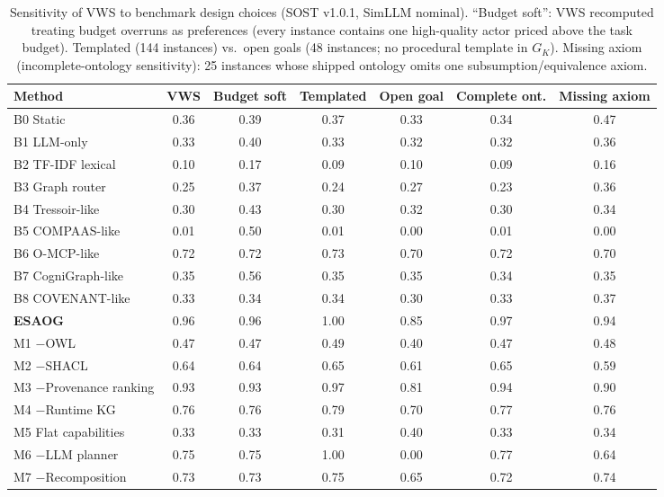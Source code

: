 \begin{table}[H]
\centering
\caption{Sensitivity of VWS to benchmark design choices (SOST v1.0.1, SimLLM nominal). ``Budget soft'': VWS recomputed treating budget overruns as preferences (every instance contains one high-quality actor priced above the task budget). Templated (144 instances) vs.\ open goals (48 instances; no procedural template in $G_K$). Missing axiom (incomplete-ontology sensitivity): 25 instances whose shipped ontology omits one subsumption/equivalence axiom.}
\label{tab:robust}
\scriptsize
\begin{tabular}{lcccccc}
\toprule
Method & VWS & Budget soft & Templated & Open goal & Complete ont. & Missing axiom\\
\midrule
B0 Static & 0.36 & 0.39 & 0.37 & 0.33 & 0.34 & 0.47\\
B1 LLM-only & 0.33 & 0.40 & 0.33 & 0.32 & 0.32 & 0.36\\
B2 TF-IDF lexical & 0.10 & 0.17 & 0.09 & 0.10 & 0.09 & 0.16\\
B3 Graph router & 0.25 & 0.37 & 0.24 & 0.27 & 0.23 & 0.36\\
B4 Tressoir-like & 0.30 & 0.43 & 0.30 & 0.32 & 0.30 & 0.34\\
B5 COMPAAS-like & 0.01 & 0.50 & 0.01 & 0.00 & 0.01 & 0.00\\
B6 O-MCP-like & 0.72 & 0.72 & 0.73 & 0.70 & 0.72 & 0.70\\
B7 CogniGraph-like & 0.35 & 0.56 & 0.35 & 0.35 & 0.34 & 0.35\\
B8 COVENANT-like & 0.33 & 0.34 & 0.34 & 0.30 & 0.33 & 0.37\\
\textbf{ESAOG} & 0.96 & 0.96 & 1.00 & 0.85 & 0.97 & 0.94\\
M1 $-$OWL & 0.47 & 0.47 & 0.49 & 0.40 & 0.47 & 0.48\\
M2 $-$SHACL & 0.64 & 0.64 & 0.65 & 0.61 & 0.65 & 0.59\\
M3 $-$Provenance ranking & 0.93 & 0.93 & 0.97 & 0.81 & 0.94 & 0.90\\
M4 $-$Runtime KG & 0.76 & 0.76 & 0.79 & 0.70 & 0.77 & 0.76\\
M5 Flat capabilities & 0.33 & 0.33 & 0.31 & 0.40 & 0.33 & 0.34\\
M6 $-$LLM planner & 0.75 & 0.75 & 1.00 & 0.00 & 0.77 & 0.64\\
M7 $-$Recomposition & 0.73 & 0.73 & 0.75 & 0.65 & 0.72 & 0.74\\
\bottomrule
\end{tabular}
\end{table}
